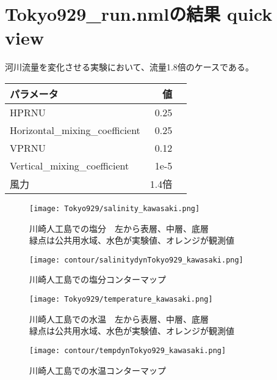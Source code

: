 \documentclass[fontsize=12pt,paper=a4]{jlreq}
\begin{document}
\section{Tokyo929\_run.nmlの結果 quick view}
河川流量を変化させる実験において、流量1.8倍のケースである。

\begin{table}
  \begin{minipage}[hbtp]{0.5\hsize}
    \begin{tabular}{lrr} \toprule
      パラメータ & 値 \\ \midrule
      HPRNU & 0.25\\
      Horizontal\_mixing\_coefficient & 0.25\\
      VPRNU & 0.12\\
      Vertical\_mixing\_coefficient & 1e-5\\
      風力 & 1.4倍\\ \bottomrule
    \end{tabular}
  \end{minipage}
\end{table}

\begin{figure}[hbtp]
        \centering
        \texttt{[image: Tokyo929/salinity\_kawasaki.png]}
        \caption{川崎人工島での塩分　左から表層、中層、底層\\緑点は公共用水域、水色が実験値、オレンジが観測値}
\end{figure}

\begin{figure}[hbtp]
        \centering
        \texttt{[image: contour/salinitydynTokyo929\_kawasaki.png]}
        \caption{川崎人工島での塩分コンターマップ}
\end{figure}


\begin{figure}[hbtp]
        \centering
        \texttt{[image: Tokyo929/temperature\_kawasaki.png]}
        \caption{川崎人工島での水温　左から表層、中層、底層\\緑点は公共用水域、水色が実験値、オレンジが観測値}
\end{figure}

\begin{figure}[hbtp]
    \centering
    \texttt{[image: contour/tempdynTokyo929\_kawasaki.png]}
    \caption{川崎人工島での水温コンターマップ}
\end{figure}
\end{document}
